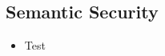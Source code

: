 \documentclass[]{article}
\begin{document}
\subsection{Semantic Security}
\begin{itemize}
	\item Test
\end{itemize}
\end{document}
